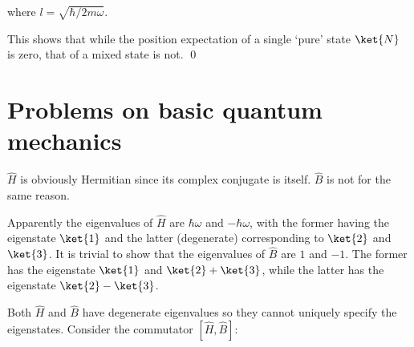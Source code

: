 \documentclass[12pt]{article}
\begin{document}
where $l = \sqrt{\hbar/2m\omega}$.

This shows that while the position expectation of a single `pure' state $\ket{N}$ is zero, that of a mixed state is not.
\qed


\pagebreak
\section*{Problems on basic quantum mechanics}


$\hat{H}$ is obviously Hermitian since its complex conjugate is itself. $\hat{B}$ is not for the same reason.

Apparently the eigenvalues of $\hat{H}$ are $\hbar \omega$ and $-\hbar \omega$, with the former having the eigenstate $\ket{1}$ and the latter (degenerate) corresponding to $\ket{2}$ and $\ket{3}$. It is trivial to show that the eigenvalues of $\hat{B}$ are $1$ and $-1$. The former has the eigenstate $\ket{1}$ and $\ket{2} + \ket{3}$, while the latter has the eigenstate $\ket{2} - \ket{3}$.

Both $\hat{H}$ and $\hat{B}$ have degenerate eigenvalues so they cannot uniquely specify the eigenstates. Consider the commutator $[\hat{H}, \hat{B}]$:
\end{document}
